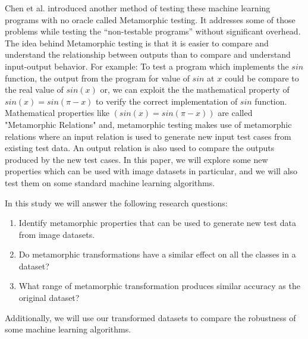 Chen et al. introduced another method of testing these machine learning programs with no oracle called Metamorphic testing. It addresses some of those problems while testing the \enquote{non-testable programs} without significant overhead. The idea behind Metamorphic testing is that it is easier to compare and understand the relationship between outputs than to compare and understand input-output behavior. For example: To test a program which implements the $sin$ function, the output from the program for value of $sin$ at $x$ could be compare to the real value of $sin(x)$ or, we can exploit the the mathematical property of $sin(x) = sin(\pi-x)$ to verify the correct implementation of $sin$ function. Mathematical properties like $(sin(x) = sin(\pi-x))$ are called "Metamorphic Relations" and, metamorphic testing makes use of metamorphic relations where an input relation is used to generate new input test cases from existing test data. An output relation is also used to compare the outputs produced by the new test cases.
\newline
In this paper, we will explore some new properties which can be used with image datasets in particular, and we will also test them on some standard machine learning algorithms.


In this study we will answer the following research questions:
\begin{enumerate}
    \item Identify metamorphic properties that can be used to generate new test data from image datasets.
    \item Do metamorphic transformations have a similar effect on all the classes in a dataset?
    \item What range of metamorphic transformation produces similar accuracy as the original dataset?

\end{enumerate}
Additionally, we will use our transformed datasets to compare the robustness of some machine learning algorithms.
%
